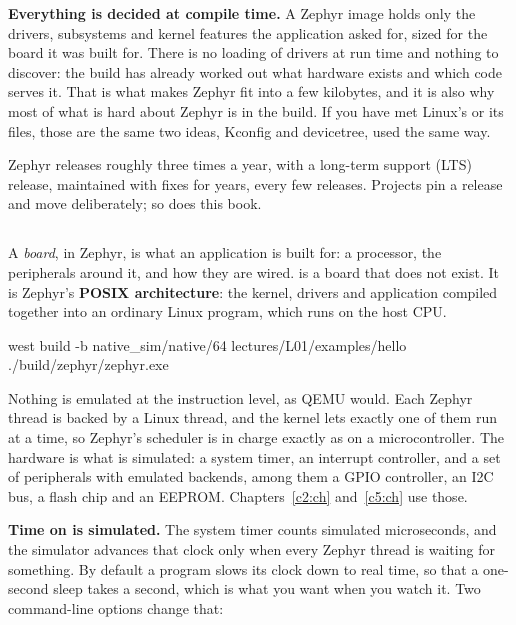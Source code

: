 \textbf{Everything is decided at compile time.} A Zephyr image holds only the drivers, subsystems
and kernel features the application asked for, sized for the board it was built for. There is no
loading of drivers at run time and nothing to discover: the build has already worked out what
hardware exists and which code serves it. That is what makes Zephyr fit into a few kilobytes, and it
is also why most of what is hard about Zephyr is in the build. If you have met Linux’s  or its  files, those are the same two ideas, Kconfig and devicetree, used the
same way.

Zephyr releases roughly three times a year, with a long-term support (LTS) release, maintained with
fixes for years, every few releases. Projects pin a release and move deliberately; so does this
book.

\subsection{}
A \emph{board}, in Zephyr, is what an application is built for: a processor, the peripherals around
it, and how they are wired.  is a board that does not exist. It is Zephyr’s
\textbf{POSIX architecture}: the kernel, drivers and application compiled together into an ordinary
Linux program, which runs on the host CPU.

\begin{shell}
west build -b native_sim/native/64 lectures/L01/examples/hello
./build/zephyr/zephyr.exe
\end{shell}

Nothing is emulated at the instruction level, as QEMU would. Each Zephyr thread is backed by a Linux
thread, and the kernel lets exactly one of them run at a time, so Zephyr’s scheduler is in charge
exactly as on a microcontroller. The hardware is what is simulated: a system timer, an interrupt
controller, and a set of peripherals with emulated backends, among them a GPIO controller, an I2C
bus, a flash chip and an EEPROM. Chapters~\ref{c2:ch} and~\ref{c5:ch} use those.

\textbf{Time on  is simulated.} The system timer counts simulated microseconds, and
the simulator advances that clock only when every Zephyr thread is waiting for something. By default
a program slows its clock down to real time, so that a one-second sleep takes a second, which is
what you want when you watch it. Two command-line options change that:

